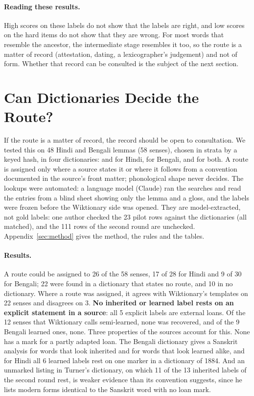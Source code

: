 \documentclass[11pt]{article}
\begin{document}
\paragraph{Reading these results.} High scores on these labels do not show that the labels are right, and low scores on the hard items do not show that they are wrong. For most words that resemble the ancestor, the intermediate stage resembles it too, so the route is a matter of record (attestation, dating, a lexicographer's judgement) and not of form. Whether that record can be consulted is the subject of the next section.

\section{Can Dictionaries Decide the Route?}
\label{sec:why}

If the route is a matter of record, the record should be open to consultation. We tested this on 48 Hindi and Bengali lemmas (58 senses), chosen in strata by a keyed hash, in four dictionaries: \citet{platts1884} and \citet{dasa1975sabdasagara} for Hindi, \citet{dasa1937bangala} for Bengali, and \citet{turner1966cdial} for both. A route is assigned only where a source states it or where it follows from a convention documented in the source's front matter; phonological shape never decides. The lookups were automated: a language model (Claude) ran the searches and read the entries from a blind sheet showing only the lemma and a gloss, and the labels were frozen before the Wiktionary side was opened. They are model-extracted, not gold labels: one author checked the 23 pilot rows against the dictionaries (all matched), and the 111 rows of the second round are unchecked. Appendix~\ref{sec:method} gives the method, the rules and the tables.

\paragraph{Results.} A route could be assigned to 26 of the 58 senses, 17 of 28 for Hindi and 9 of 30 for Bengali; 22 were found in a dictionary that states no route, and 10 in no dictionary. Where a route was assigned, it agrees with Wiktionary's templates on 22 senses and disagrees on 3. \textbf{No inherited or learned label rests on an explicit statement in a source}: all 5 explicit labels are external loans. Of the 12 senses that Wiktionary calls semi-learned, none was recovered, and of the 9 Bengali learned ones, none. Three properties of the sources account for this. None has a mark for a partly adapted loan. The Bengali dictionary gives a Sanskrit analysis for words that look inherited and for words that look learned alike, and for Hindi all 6 learned labels rest on one marker in a dictionary of 1884. And an unmarked listing in Turner's dictionary, on which 11 of the 13 inherited labels of the second round rest, is weaker evidence than its convention suggests, since he lists modern forms identical to the Sanskrit word with no loan mark.
\end{document}
